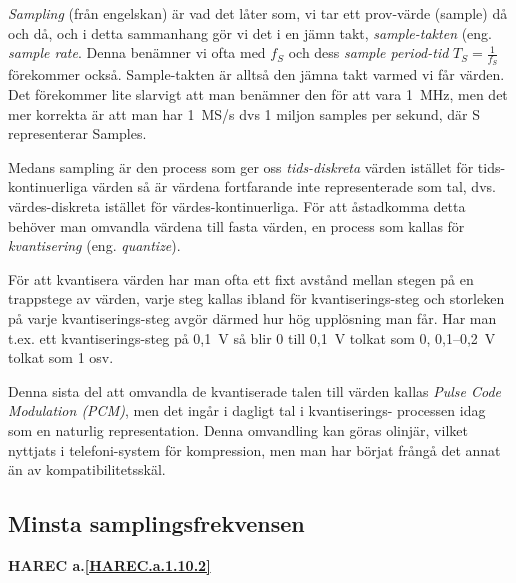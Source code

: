 \emph{Sampling} (från engelskan) är vad det låter som, vi tar ett prov-värde
(sample) då och då, och i detta sammanhang gör vi det i en jämn takt,
\emph{sample-takten} (eng. \emph{sample rate}.
Denna benämner vi ofta med \(f_S\) och dess \emph{sample period-tid}
\(T_S=\frac{1}{f_S}\) förekommer också.
Sample-takten är alltså den jämna takt varmed vi får värden.
Det förekommer lite slarvigt att man benämner den för att vara 1~MHz, men det
mer korrekta är att man har 1~MS/s dvs 1 miljon samples per sekund, där S
representerar Samples.


Medans sampling är den process som ger oss \emph{tids-diskreta} värden istället
för tids-kontinuerliga värden så är värdena fortfarande inte representerade som
tal, dvs. värdes-diskreta istället för värdes-kontinuerliga.
För att åstadkomma detta behöver man omvandla värdena till fasta värden, en
process som kallas för \emph{kvantisering} (eng. \emph{quantize}).

För att kvantisera värden har man ofta ett fixt avstånd mellan stegen på en
trappstege av värden, varje steg kallas ibland för kvantiserings-steg och
storleken på varje kvantiserings-steg avgör därmed hur hög upplösning man får.
Har man t.ex. ett kvantiserings-steg på 0,1~V så blir 0 till 0,1~V tolkat som
0, 0,1--0,2~V tolkat som 1 osv.


Denna sista del att omvandla de kvantiserade talen till värden kallas
\emph{Pulse Code Modulation (PCM)}, men det ingår i dagligt tal i kvantiserings-
processen idag som en naturlig representation.
Denna omvandling kan göras olinjär, vilket nyttjats i telefoni-system för
kompression, men man har börjat frångå det annat än av kompatibilitetsskäl.

\subsection{Minsta samplingsfrekvensen}
\textbf{HAREC a.\ref{HAREC.a.1.10.2}\label{myHAREC.a.1.10.2}}


